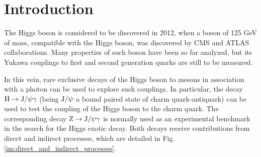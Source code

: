\documentclass[11pt, a4paper]{article}
\renewcommand{\H}{{\rm H}}
\newcommand{\Z}{{\rm Z}}
\newcommand{\JPsi}{{\rm J}/\psi}
\begin{document}

\clearpage
\pagestyle{fancy}
\lhead{}
\chead{}
\rhead{}
\renewcommand{\headrulewidth}{0.1pt}
\lfoot{} 
\cfoot{\thepage}
\rfoot{} 
\renewcommand{\footrulewidth}{0pt}
\tableofcontents

\clearpage
{}\setcounter{page}{1}
\section{Introduction\label{sec:introduction}}
The Higgs boson is considered to be discovered in 2012, when a boson of 125 GeV of mass, compatible with the Higgs boson, was discovered by CMS \cite{commissioningCMS} and ATLAS \cite{commissioningATLAS} collaborations. Many properties of such boson have been so far analyzed, but its Yukawa couplings to first and second generation quarks are still to be measured.

In this vein, rare exclusive decays of the Higgs boson to mesons in association with a photon can be used to explore such couplings. In particular, the decay $\H \rightarrow \JPsi\gamma$ (being $\JPsi$ a bound paired state of charm quark-antiquark) can be used to test the coupling of the Higgs boson to the charm quark. 
The corresponding decay $\Z \rightarrow \JPsi\gamma$ is normally used as an experimental benchmark in the search for the Higgs exotic decay. Both decays receive contributions from direct and indirect processes, which are detailed in Fig. \ref{im:direct_and_indirect_processes}.
\end{document}
